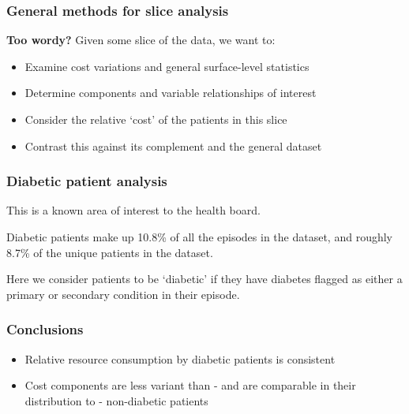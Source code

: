 \graphicspath{{./img/diabetes/}}

\begin{frame}
    \frametitle{General methods for slice analysis}
    \textbf{Too wordy?}
    Given some slice of the data, we want to:
    \begin{itemize}
        \item Examine cost variations and general surface-level statistics
        \item Determine components and variable relationships of interest
        \item Consider the relative `cost' of the patients in this slice
        \item Contrast this against its complement and the general dataset
    \end{itemize}
\end{frame}

\begin{frame}
    \frametitle{Diabetic patient analysis}

    This is a known area of interest to the health board.

    \vspace{10pt}
    Diabetic patients make up 10.8\% of all the episodes in the dataset, and
    roughly 8.7\% of the unique patients in the dataset.

    \vspace{10pt}
    Here we consider patients to be `diabetic' if they have diabetes flagged as
    either a primary or secondary condition in their episode.
\end{frame}







\begin{frame}
    \frametitle{Conclusions}

    \begin{itemize}
        \item Relative resource consumption by diabetic patients is consistent
        \item Cost components are less variant than \-- and are comparable in
            their distribution to \-- non-diabetic patients
    \end{itemize}
\end{frame}
